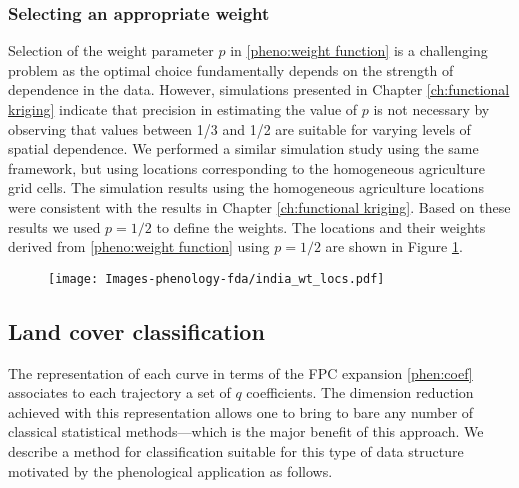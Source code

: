\subsubsection{Selecting an appropriate weight} 

\label{sub:selecting_an_appropriate_weight} 
Selection of the weight parameter $p$ in \eqref{pheno:weight function} is a challenging problem as the optimal choice fundamentally depends on the strength of dependence in the data. However, simulations presented in Chapter \ref{ch:functional kriging} indicate that precision in estimating the value of $p$ is not necessary by observing that values between 1/3 and 1/2 are suitable for varying levels of spatial dependence. We performed a similar simulation study using the same framework, but using locations corresponding to the homogeneous agriculture grid cells. The simulation results using the homogeneous agriculture locations were consistent with the results in Chapter \ref{ch:functional kriging}. Based on these results we used $p=1/2$ to define the weights. The locations and their weights derived from \eqref{pheno:weight function} using $p=1/2$ are shown in Figure \ref{fig:india weighted locs}. 
\begin{figure}
	[h] \centering 
	\texttt{[image: Images-phenology-fda/india\_wt\_locs.pdf]}  \label{fig:india weighted locs} 
\end{figure}


\subsection{Land cover classification} 
\label{sub:land_cover_classification}

The representation of each curve in terms of the FPC expansion \eqref{phen:coef} associates to each trajectory a set of $q$ coefficients. The dimension reduction achieved with this representation allows one to bring to bare any number of classical statistical methods---which is the major benefit of this approach. We describe a method for classification suitable for this type of data structure motivated by the phenological application as follows.


